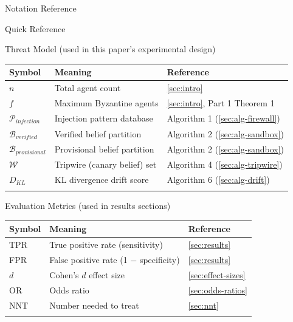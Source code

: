 \documentclass[
  ignorenonframetext,
]{beamer}
\newcounter{none} %
\begin{document}
\begin{frame}{Notation Reference}
\begin{block}{Quick Reference}
\begin{block}{Threat Model (used in this paper's experimental design)}
\protect{}\label{threat-model-used-in-this-papers-experimental-design}
{\def\LTcaptype{none} %
\begin{longtable}[]{@{}
  >{\raggedright\arraybackslash}p{}
  >{\raggedright\arraybackslash}p{}
  >{\raggedright\arraybackslash}p{}@{}}
\toprule\noalign{}
\begin{minipage}[b]{\linewidth}\raggedright
Symbol
\end{minipage} & \begin{minipage}[b]{\linewidth}\raggedright
Meaning
\end{minipage} & \begin{minipage}[b]{\linewidth}\raggedright
Reference
\end{minipage} \\
\midrule\noalign{}
\endhead
\(n\) & Total agent count & \cref{sec:intro} \\
\(f\) & Maximum Byzantine agents & \cref{sec:intro}, Part 1 Theorem 1 \\
\(\mathcal{P}_{injection}\) & Injection pattern database & Algorithm 1
(\cref{sec:alg-firewall}) \\
\(\mathcal{B}_{verified}\) & Verified belief partition & Algorithm 2
(\cref{sec:alg-sandbox}) \\
\(\mathcal{B}_{provisional}\) & Provisional belief partition & Algorithm
2 (\cref{sec:alg-sandbox}) \\
\(\mathcal{W}\) & Tripwire (canary belief) set & Algorithm 4
(\cref{sec:alg-tripwire}) \\
\(D_{KL}\) & KL divergence drift score & Algorithm 6
(\cref{sec:alg-drift}) \\
\bottomrule\noalign{}
\end{longtable}
}
\end{block}

\begin{block}{Evaluation Metrics (used in results sections)}
\protect{}\label{evaluation-metrics-used-in-results-sections}
{\def\LTcaptype{none} %
\begin{longtable}[]{@{}lll@{}}
\toprule\noalign{}
Symbol & Meaning & Reference \\
\midrule\noalign{}
\endhead
TPR & True positive rate (sensitivity) & \cref{sec:results} \\
FPR & False positive rate (1 \(-\) specificity) & \cref{sec:results} \\
\(d\) & Cohen's \(d\) effect size & \cref{sec:effect-sizes} \\
OR & Odds ratio & \cref{sec:odds-ratios} \\
NNT & Number needed to treat & \cref{sec:nnt} \\
\bottomrule\noalign{}
\end{longtable}
}
\end{block}
\end{block}


\end{frame}
\end{document}
